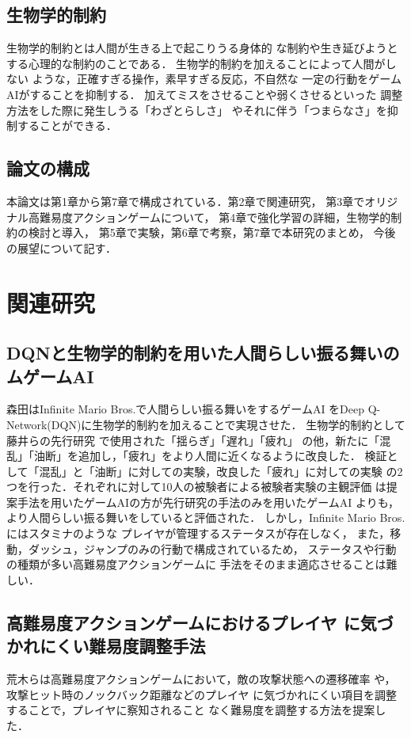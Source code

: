 \documentclass[a4paper,12pt,oneside,openany,titlepage]{jreport}
\begin{document}
\section{生物学的制約}
生物学的制約とは人間が生きる上で起こりうる身体的
な制約や生き延びようとする心理的な制約のことである．
生物学的制約を加えることによって人間がしない
ような，正確すぎる操作，素早すぎる反応，不自然な
一定の行動をゲームAIがすることを抑制する．
加えてミスをさせることや弱くさせるといった
調整方法をした際に発生しうる「わざとらしさ」
やそれに伴う「つまらなさ」を抑制することができる．

\section{論文の構成}
本論文は第1章から第7章で構成されている．第2章で関連研究，
第3章でオリジナル高難易度アクションゲームについて，
第4章で強化学習の詳細，生物学的制約の検討と導入，
第5章で実験，第6章で考察，第7章で本研究のまとめ，
今後の展望について記す．


\newpage

\chapter{関連研究}
 \thispagestyle{fancy}
 \lhead{\leftmark}
 \rhead{\thepage}
 \renewcommand{\headrulewidth}{1pt}

 \section{DQNと生物学的制約を用いた人間らしい振る舞いのムゲームAI}
 森田はInfinite Mario Bros.で人間らしい振る舞いをするゲームAI
 をDeep Q-Network(DQN)に生物学的制約を加えることで実現させた\cite{morita}．
 生物学的制約として藤井らの先行研究\cite{FuJi_en}
 で使用された「揺らぎ」「遅れ」「疲れ」
 の他，新たに「混乱」「油断」を追加し，「疲れ」をより人間に近くなるように改良した．
 検証として「混乱」と「油断」に対しての実験，改良した「疲れ」に対しての実験
 の2つを行った．それぞれに対して10人の被験者による被験者実験の主観評価
 は提案手法を用いたゲームAIの方が先行研究の手法のみを用いたゲームAI
 よりも，より人間らしい振る舞いをしていると評価された．
 しかし，Infinite Mario Bros.にはスタミナのような
 プレイヤが管理するステータスが存在しなく，
 また，移動，ダッシュ，ジャンプのみの行動で構成されているため，
 ステータスや行動の種類が多い高難易度アクションゲームに
 手法をそのまま適応させることは難しい．
 
 \newpage

 \section{高難易度アクションゲームにおけるプレイヤ
 に気づかれにくい難易度調整手法}\label{teigi}
 荒木らは高難易度アクションゲームにおいて，敵の攻撃状態への遷移確率
 や，攻撃ヒット時のノックバック距離などのプレイヤ
 に気づかれにくい項目を調整することで，プレイヤに察知されること
 なく難易度を調整する方法を提案した．\cite{dif-action}
 
\end{document}
